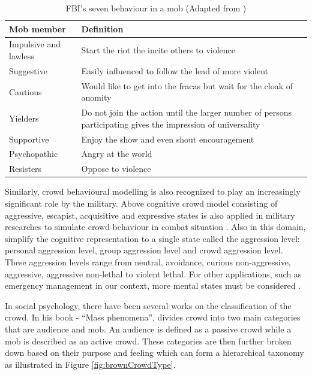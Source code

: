 \begin{table}
	\caption{FBI's seven behaviour in a mob (Adapted from \citet{FBI1967})}
	\label{table:fbiMobBehavior}
	\centering
	\begin{tabular}{|l|p{10cm}|}
		\hline
		\textbf{Mob member} & \textbf{Definition} \\
		\hline
		Impulsive and lawless & Start the riot the incite others to violence \\
		\hline
		Suggestive &  Easily influenced to follow the lead of more violent \\
		\hline
		Cautious & Would like to get into the fracas but wait for the cloak of anomity \\
		\hline
		Yielders & Do not join the action until the larger number of persons participating gives the impression of universality \\
		\hline
		Supportive & Enjoy the show and even shout encouragement \\
		\hline
		Psychopathic & Angry at the world \\
		\hline
		Resisters & Oppose to violence \\			
		\hline
	\end{tabular}
\end{table}

Similarly, crowd behavioural modelling is also recognized to play an increasingly significant role by the military. Above cognitive crowd model consisting of aggressive, escapist, acquisitive and expressive states is also applied in military researches to simulate crowd behaviour in combat situation \citep{Petty2004}. Also in this domain, \citet{Nguyen2005} simplify the cognitive representation to a single state called the aggression level: personal aggression level, group aggression level and crowd aggression level. These aggression levels range from neutral, avoidance, curious non-aggressive, aggressive, aggressive non-lethal to violent lethal. For other applications, such as emergency management in our context, more mental states must be considered \citep{Zhou2010}.

In social psychology, there have been several works on the classification of the crowd. In his book - ``Mass phenomena'', \citet{Brown1954} divides crowd into two main categories that are audience and mob. An audience is defined as a passive crowd while a mob is described as an active crowd. These categories are then further broken down based on their purpose and feeling \citep{Pelechano2008} which can form a hierarchical taxonomy as illustrated in Figure \ref{fig:brownCrowdType}.

